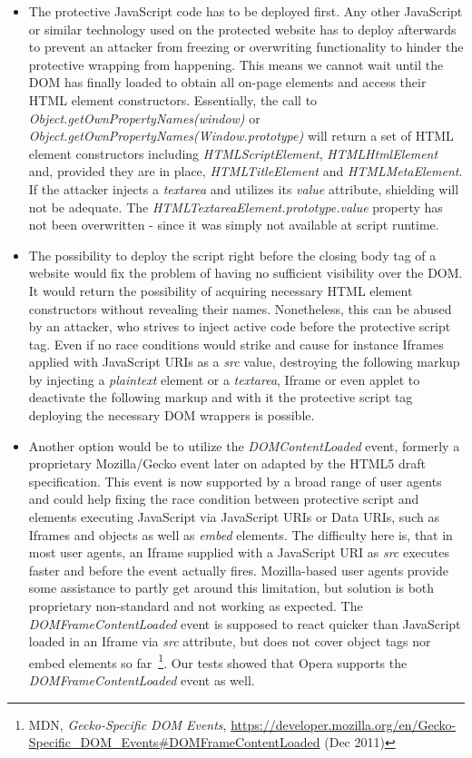     \begin{itemize}
     \item The protective JavaScript code has to be deployed first. Any other JavaScript or similar technology used on the protected website has to deploy afterwards to prevent an attacker from freezing or overwriting functionality to hinder the protective wrapping from happening. This means we cannot wait until the DOM has finally loaded to obtain all on-page elements and access their HTML element constructors. Essentially, the call to \textit{Object.getOwnPropertyNames(window)} or \textit{Object.getOwnPropertyNames(Window.prototype)} will return a set of HTML element constructors including \textit{HTMLScriptElement}, \textit{HTMLHtmlElement} and, provided they are in place, \textit{HTMLTitleElement} and \textit{HTMLMetaElement}. If the attacker injects a \textit{textarea} and utilizes its \textit{value} attribute, shielding will not be adequate. The \textit{HTMLTextareaElement.prototype.value} property has not been overwritten - since it was simply not available at script runtime.
     \item The possibility to deploy the script right before the closing body tag of a website would fix the problem of having no sufficient visibility over the DOM. It would return the possibility of acquiring necessary HTML element constructors without revealing their names. Nonetheless, this can be abused by an attacker, who strives to inject active code before the protective script tag. Even if no race conditions would strike and cause for instance Iframes applied with JavaScript URIs as a \textit{src} value, destroying the following markup by injecting a \textit{plaintext} element or a \textit{textarea}, Iframe or even applet to deactivate the following markup and with it the protective script tag deploying the necessary DOM wrappers is possible. 
     \item Another option would be to utilize the \textit{DOMContentLoaded} event, formerly a proprietary Mozilla/Gecko event later on adapted by the HTML5 draft specification. This event is now supported by a broad range of user agents and could help fixing the race condition between protective script and elements executing JavaScript via JavaScript URIs or Data URIs, such as Iframes and objects as well as \textit{embed} elements. The difficulty here is, that in most user agents, an Iframe supplied with a JavaScript URI as \textit{src} executes faster and before the event actually fires. Mozilla-based user agents provide some assistance to partly get around this limitation, but solution is both proprietary non-standard and not working as expected. The \textit{DOMFrameContentLoaded} event is supposed to react quicker than JavaScript loaded in an Iframe via \textit{src} attribute, but does not cover object tags nor embed elements so far~\footnote{MDN, \textit{Gecko-Specific DOM Events}, \url{https://developer.mozilla.org/en/Gecko-Specific_DOM_Events#DOMFrameContentLoaded} (Dec 2011)}. Our tests showed that Opera supports the \textit{DOMFrameContentLoaded} event as well.
    \end{itemize}


